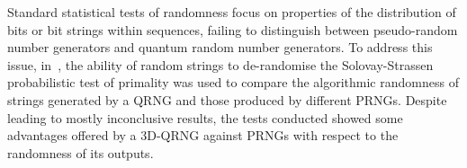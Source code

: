 \documentclass[l1pt]{elsarticle}
\begin{document}



Standard statistical tests of randomness focus on properties of the distribution of bits or bit strings within sequences, failing to distinguish between pseudo-random number generators and quantum random number generators. To address this issue, in~\cite{abbott2018experimentally}, the ability of random strings to de-randomise the Solovay-Strassen probabilistic test of primality was used to compare the algorithmic randomness of strings generated by a QRNG and those produced by different PRNGs. Despite leading to mostly inconclusive results, the tests conducted showed some advantages offered by a 3D-QRNG against PRNGs with respect to the randomness of its outputs.
\end{document}
